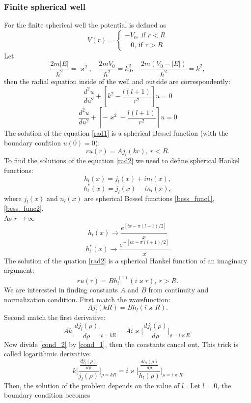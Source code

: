 \documentclass[a4paper, 11pt]{article}
\begin{document}
\subsubsection{Finite spherical well}
For the finite spherical well the  potential is defined as
$$V(r)=\begin{cases}
-V_0, ~\text{if } r< R\\
~~~~0, ~\text{if } r>R
\end{cases}$$
Let
$$\frac{2m|E|}{\hbar^2} = \varkappa^2, ~~~~\frac{2m V_0}{\hbar^2}=k_0^2, ~~~~\frac{2m(V_0-|E|)}{\hbar^2} =k^2,$$
then the radial equation inside of the well and outside are correspondently:
\begin{equation}\label{rad1}
	\frac{d^2 u}{du^2}+[k^2-\frac{l(l+1)}{r^2}]u=0
\end{equation}
\begin{equation}\label{rad2}
	\frac{d^2 u}{du^2}+[-\varkappa^2-\frac{l(l+1)}{r^2}]u=0
\end{equation}
The solution of the equation \eqref{rad1} is a spherical Bessel function (with the boundary confition $u(0) =0$):
$$r u(r) =A j_l(kr), ~r< R.$$
To find the solutions of the equation \eqref{rad2} we need to define spherical Hankel functions:
$$h_l(x) = j_l(x)+in_l(x),$$
$$h_l^*(x)=j_l(x)-in_l(x),$$
where $j_l(x)$ and $n_l(x)$ are spherical Bessel functions \eqref{bess_func1}, \eqref{bess_func2}.\\
As $r \to \infty$
$$h_l(x) \to \frac{e^{[ix-\pi (l+1)/2]}}{x}$$
$$h_l^*(x) \to \frac{e^{-[ix-\pi (l+1)/2]}}{x}$$
The solution of the quation \eqref{rad2} is a spherical Hankel function of an imaginary argument:
$$r u(r) = B h_l^{(1)}(i \varkappa r), ~r>R.$$
We are interested in finding constants $A$ and $B$ from continuity and normalization condition. First match the wavefunction:
\begin{equation}\label{cond_1}
	A j_l(kR)=B h_l(i \varkappa R).
\end{equation}
Second match the first derivative:
\begin{equation}\label{cond_2}
	A k \bigg[\frac{d j_l(\rho)}{d\rho}\bigg]_{\rho = kR} = A i \varkappa \bigg[\frac{d j_l(\rho)}{d\rho}\bigg]_{\rho = i \varkappa R}.
\end{equation}
Now divide \eqref{cond_2} by \eqref{cond_1}, then the constants cancel out. This trick is called logarithmic derivative:
$$k\bigg[ \frac{\frac{d j_l(\rho)}{d \rho}}{j_l(\rho)} \bigg]_{\rho = kR} = i\varkappa \bigg[ \frac{\frac{d h_l(\rho)}{d \rho}}{h_l(\rho)} \bigg]_{\rho = i \varkappa R} $$
 Then, the solution of the problem depends on the value of $l$ . Let $l=0$, the boundary condition becomes
\end{document}
